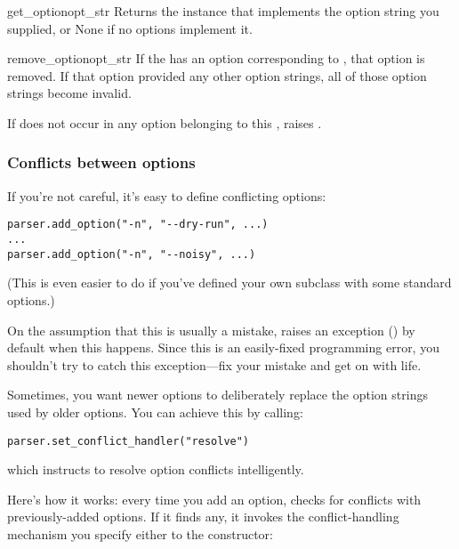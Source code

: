 \begin{methoddesc}{get_option}{opt_str}
    Returns the  instance that implements the option
    string you supplied, or None if no options implement it.
\end{methoddesc}

\begin{methoddesc}{remove_option}{opt_str}
    If the  has an option corresponding to
    , that option is removed.  If that option provided
    any other option strings, all of those option strings become
    invalid.

    If  does not occur in any option belonging to this
    , raises .
\end{methoddesc}

\subsubsection{Conflicts between options\label{optparse-conflicts}}

If you're not careful, it's easy to define conflicting options:

\begin{verbatim}
parser.add_option("-n", "--dry-run", ...)
...
parser.add_option("-n", "--noisy", ...)
\end{verbatim} 

(This is even easier to do if you've defined your own
 subclass with some standard options.)

On the assumption that this is usually a mistake, 
raises an exception () by default when
this happens.  Since this is an easily-fixed programming error, you
shouldn't try to catch this exception---fix your mistake and get on
with life.

Sometimes, you want newer options to deliberately replace the option
strings used by older options.  You can achieve this by calling:

\begin{verbatim}
parser.set_conflict_handler("resolve")
\end{verbatim}

which instructs  to resolve option conflicts
intelligently.

Here's how it works: every time you add an option, 
checks for conflicts with previously-added options.  If it finds any,
it invokes the conflict-handling mechanism you specify either to the
 constructor:


